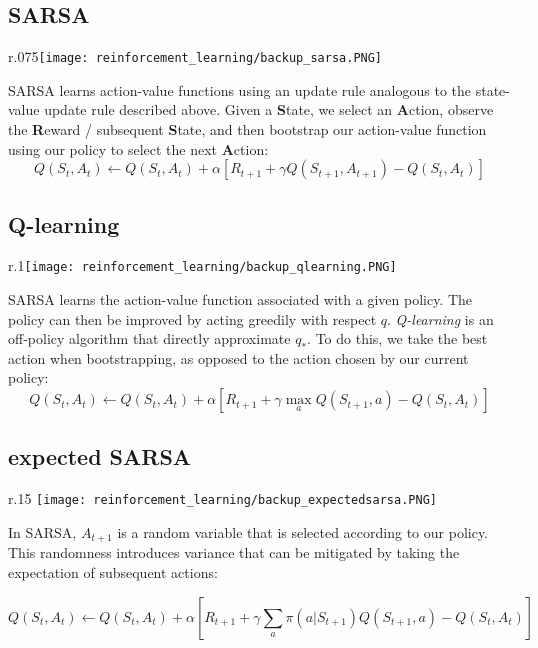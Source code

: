 \subsection{SARSA}

\begin{wrapfigure}{r}{.075\linewidth}\texttt{[image: reinforcement\_learning/backup\_sarsa.PNG]}\end{wrapfigure}

SARSA learns action-value functions using an update rule analogous to the state-value update rule described above. Given a \textbf{S}tate, we select an \textbf{A}ction, observe the \textbf{R}eward / subsequent \textbf{S}tate, and then bootstrap our action-value function using our policy to select the next \textbf{A}ction:
$$  Q(S_t, A_t) \leftarrow Q(S_t, A_t) + \alpha [R_{t+1}  + \gamma Q(S_{t+1}, A_{t+1}) - Q(S_t, A_t)]  $$

\subsection{Q-learning}

\begin{wrapfigure}{r}{.1\linewidth}\texttt{[image: reinforcement\_learning/backup\_qlearning.PNG]}\end{wrapfigure}

SARSA learns the action-value function associated with a given policy. The policy can then be improved by acting greedily with respect $q$. \textit{Q-learning} is an off-policy algorithm that directly approximate $q_*$. To do this, we take the best action when bootstrapping, as opposed to the action chosen by our current policy:
$$  Q(S_t, A_t) \leftarrow Q(S_t, A_t) + \alpha [R_{t+1}  + \gamma \max_a Q(S_{t+1}, a) - Q(S_t, A_t)]  $$
\subsection{expected SARSA}

\begin{wrapfigure}{r}{.15 \linewidth}\texttt{[image: reinforcement\_learning/backup\_expectedsarsa.PNG]}\end{wrapfigure}

In SARSA, $A_{t+1}$ is a random variable that is selected according to our policy. This randomness introduces variance that can be mitigated by taking the expectation of subsequent actions:

$$  Q(S_t, A_t) \leftarrow Q(S_t, A_t) + \alpha [R_{t+1}  + \gamma \sum_a \pi(a|S_{t+1}) Q(S_{t+1}, a) - Q(S_t, A_t)]  $$

